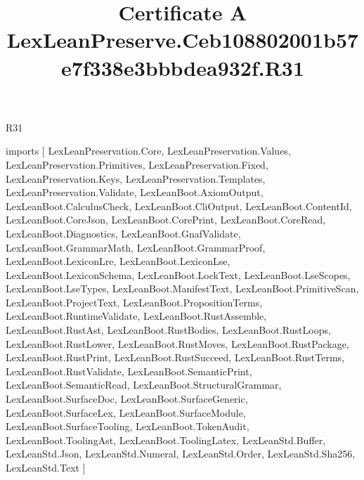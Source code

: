 \begin{lexlean}{R31}
\title{Certificate A LexLeanPreserve.Ceb108802001b57e7f338e3bbbdea932f.R31}
\begin{coremodule}
imports [
  LexLeanPreservation.Core,
  LexLeanPreservation.Values,
  LexLeanPreservation.Primitives,
  LexLeanPreservation.Fixed,
  LexLeanPreservation.Keys,
  LexLeanPreservation.Templates,
  LexLeanPreservation.Validate,
  LexLeanBoot.AxiomOutput,
  LexLeanBoot.CalculusCheck,
  LexLeanBoot.CliOutput,
  LexLeanBoot.ContentId,
  LexLeanBoot.CoreJson,
  LexLeanBoot.CorePrint,
  LexLeanBoot.CoreRead,
  LexLeanBoot.Diagnostics,
  LexLeanBoot.GnafValidate,
  LexLeanBoot.GrammarMath,
  LexLeanBoot.GrammarProof,
  LexLeanBoot.LexiconLre,
  LexLeanBoot.LexiconLse,
  LexLeanBoot.LexiconSchema,
  LexLeanBoot.LockText,
  LexLeanBoot.LseScopes,
  LexLeanBoot.LseTypes,
  LexLeanBoot.ManifestText,
  LexLeanBoot.PrimitiveScan,
  LexLeanBoot.ProjectText,
  LexLeanBoot.PropositionTerms,
  LexLeanBoot.RuntimeValidate,
  LexLeanBoot.RustAssemble,
  LexLeanBoot.RustAst,
  LexLeanBoot.RustBodies,
  LexLeanBoot.RustLoops,
  LexLeanBoot.RustLower,
  LexLeanBoot.RustMoves,
  LexLeanBoot.RustPackage,
  LexLeanBoot.RustPrint,
  LexLeanBoot.RustSucceed,
  LexLeanBoot.RustTerms,
  LexLeanBoot.RustValidate,
  LexLeanBoot.SemanticPrint,
  LexLeanBoot.SemanticRead,
  LexLeanBoot.StructuralGrammar,
  LexLeanBoot.SurfaceDoc,
  LexLeanBoot.SurfaceGeneric,
  LexLeanBoot.SurfaceLex,
  LexLeanBoot.SurfaceModule,
  LexLeanBoot.SurfaceTooling,
  LexLeanBoot.TokenAudit,
  LexLeanBoot.ToolingAst,
  LexLeanBoot.ToolingLatex,
  LexLeanStd.Buffer,
  LexLeanStd.Json,
  LexLeanStd.Numeral,
  LexLeanStd.Order,
  LexLeanStd.Sha256,
  LexLeanStd.Text
]


\end{coremodule}
\end{lexlean}
